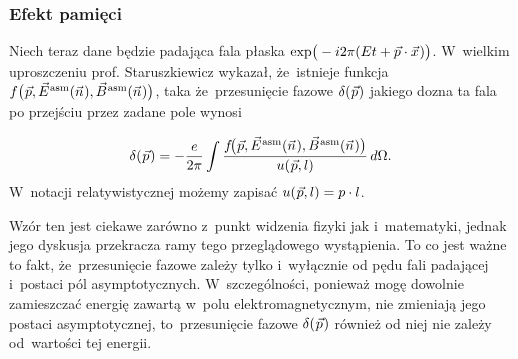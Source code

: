 \documentclass[10pt,t]{beamer}
\begin{document}
\begin{frame}
  \frametitle{Efekt pamięci}


  Niech teraz dane będzie padająca fala płaska
  $\exp\!\big( -i 2\pi ( E t + \vec{p} \cdot \vec{x} \hspace{0.05em} ) \big)$. W~wielkim
  uproszczeniu prof. Staruszkiewicz wykazał, że~istnieje funkcja
  $f\big( \hspace{0.05em} \vec{p}, \vec{E}^{ \hspace{0.05em} \text{asm} }( \vec{n} \hspace{0.05em} ), \vec{B}^{ \hspace{0.05em} \text{asm} }( \vec{n} \hspace{0.05em} ) \big)$, taka
  że~przesunięcie fazowe $\delta( \hspace{0.05em} \vec{p} \hspace{0.05em} )$ jakiego
  dozna ta fala po przejściu przez zadane pole wynosi

  \vspace{-1em}


  \begin{equation}
    \label{eq:Pola-asymptotyczne-i-efekt-pamieci-01}
    \delta( \hspace{0.05em} \vec{p} \hspace{0.05em} ) =
    -\frac{ e }{ 2\pi }
    \int \frac{ f\!\big( \hspace{0.05em} \vec{p}, \vec{E}^{ \hspace{0.05em} \text{asm} }( \vec{n} \hspace{0.05em} ),
      \vec{B}^{ \hspace{0.05em} \text{asm} }( \vec{n} \hspace{0.05em} ) \big) }{ u( \hspace{0.05em} \vec{p}, l ) } \, d\Omega.
  \end{equation}
  W~notacji relatywistycznej możemy zapisać
  $u( \hspace{0.05em} \vec{p}, l ) = p \cdot l$.

  Wzór ten jest ciekawe zarówno z~punkt widzenia fizyki jak i~matematyki,
  jednak jego dyskusja przekracza ramy tego przeglądowego wystąpienia. To co
  jest ważne to fakt, że~przesunięcie fazowe zależy \alert{tylko
    i~wyłącznie} od pędu fali padającej i~postaci pól asymptotycznych.
  W~szczególności, ponieważ mogę dowolnie zamieszczać energię zawartą
  w~polu elektromagnetycznym, nie zmieniają jego postaci asymptotycznej,
  to~przesunięcie fazowe $\delta( \hspace{0.05em} \vec{p} \hspace{0.05em} )$ również od
  niej nie zależy od~wartości tej energii.

\end{frame}
\end{document}
